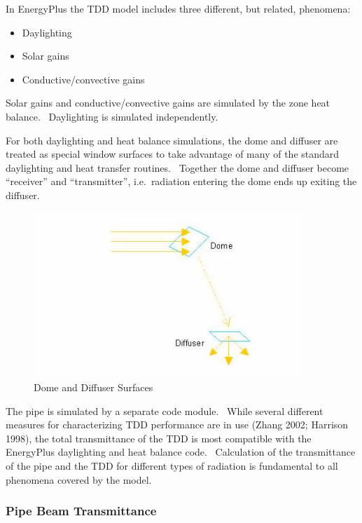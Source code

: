In EnergyPlus the TDD model includes three different, but related, phenomena:

\begin{itemize}
\item
  Daylighting
\item
  Solar gains
\item
  Conductive/convective gains
\end{itemize}

Solar gains and conductive/convective gains are simulated by the zone heat balance.~ Daylighting is simulated independently.

For both daylighting and heat balance simulations, the dome and diffuser are treated as special window surfaces to take advantage of many of the standard daylighting and heat transfer routines.~ Together the dome and diffuser become ``receiver'' and ``transmitter'', i.e.~radiation entering the dome ends up exiting the diffuser.

\begin{figure}[hbtp] %
\centering
\includegraphics[width=0.9\textwidth, height=0.9\textheight, keepaspectratio=true]{media/image870.png}
\caption{Dome and Diffuser Surfaces \protect \label{fig:dome-and-diffuser-surfaces}}
\end{figure}

The pipe is simulated by a separate code module.~ While several different measures for characterizing TDD performance are in use (Zhang 2002; Harrison 1998), the total transmittance of the TDD is most compatible with the EnergyPlus daylighting and heat balance code.~ Calculation of the transmittance of the pipe and the TDD for different types of radiation is fundamental to all phenomena covered by the model.

\subsubsection{Pipe Beam Transmittance}\label{pipe-beam-transmittance}


